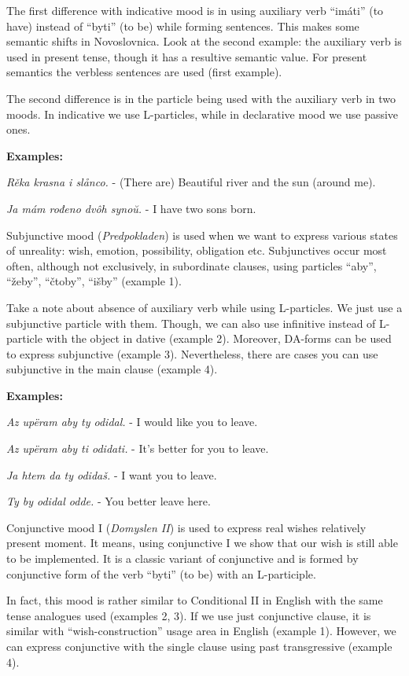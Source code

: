 The first difference with indicative mood is in using auxiliary verb “imáti” (to have) instead of “byti” (to be) while forming sentences. This makes some semantic shifts in Novoslovnica. Look at the second example: the auxiliary verb is used in present tense, though it has a resultive semantic value. For present semantics the verbless sentences are used (first example).

The second difference is in the particle being used with the auxiliary verb in two moods. In indicative we use L-particles, while in declarative mood we use passive ones.

\textbf{Examples:}

\textit{Rěka krasna i slånco.} - (There are) Beautiful river and the sun (around me).

\textit{Ja mám rođeno dvôh synoŭ.} - I have two sons born.

Subjunctive mood (\textit{Predpokladen}) is used when we want to express various states of unreality: wish, emotion, possibility, obligation etc. Subjunctives occur most often, although not exclusively, in subordinate clauses, using particles “aby”, “žeby”, “čtoby”, “išby” (example 1).

Take a note about absence of auxiliary verb while using L-particles. We just use a subjunctive particle with them. Though, we can also use infinitive instead of L-particle with the object in dative (example 2). Moreover, DA-forms can be used to express subjunctive (example 3). Nevertheless, there are cases you can use subjunctive in the main clause (example 4). 

\textbf{Examples:}

\textit{Az upëram aby ty odidal.} - I would like you to leave.

\textit{Az upëram aby ti odidati.} - It’s better for you to leave.

\textit{Ja htem da ty odidaš.} - I want you to leave.

\textit{Ty by odidal odde.} - You better leave here.

Conjunctive mood I (\textit{Domyslen II}) is used to express real wishes relatively present moment. It means, using conjunctive I we show that our wish is still able to be implemented. It is a classic variant of conjunctive and is formed by conjunctive form of the verb “byti” (to be) with an L-participle.

In fact, this mood is rather similar to Conditional II in English with the same tense analogues used (examples 2, 3). If we use just conjunctive clause, it is similar with “wish-construction” usage area in English (example 1). However, we can express conjunctive with the single clause using past transgressive (example 4).

